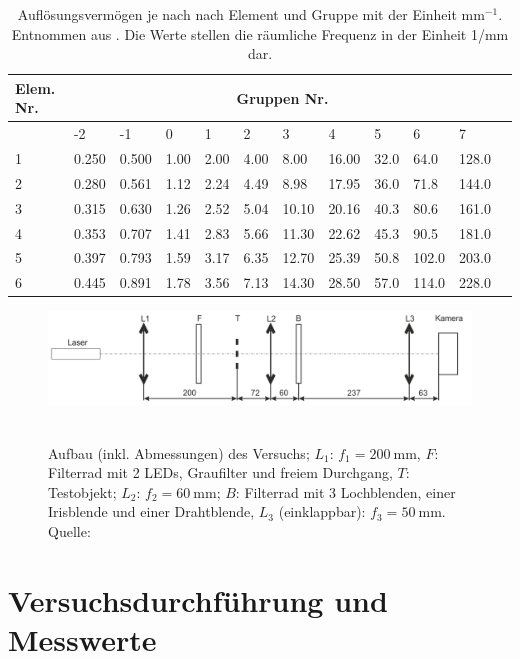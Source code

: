 \documentclass{article}
\begin{document}
\begin{table}[H]
\caption{Auflösungsvermögen je nach nach Element und Gruppe mit der Einheit mm$^{-1}$. Entnommen aus \cite{quelle6}. Die Werte stellen die räumliche Frequenz in der Einheit 1/mm dar.}
\label{tab:aufl}
\begin{tabular}{|l||l|l|l|l|l|l|l|l|l|l|l|}
\hline
\textbf{Elem. Nr.} & \multicolumn{10}{|c|}{\textbf{Gruppen Nr.}}\\
\hline
& -2 & -1 & 0 & 1 & 2 & 3 & 4 & 5 & 6 & 7 \\
\hline
1 & 0.250 & 0.500 & 1.00 & 2.00 & 4.00 & 8.00 & 16.00 & 32.0 & 64.0 & 128.0 \\
\hline
2 & 0.280 & 0.561 & 1.12 & 2.24 & 4.49 & 8.98 & 17.95 & 36.0 & 71.8 & 144.0 \\
\hline
3 & 0.315 & 0.630 & 1.26 & 2.52 & 5.04 & 10.10 & 20.16 & 40.3 & 80.6 &  161.0 \\
\hline
4 & 0.353 & 0.707 & 1.41 & 2.83 & 5.66 & 11.30 & 22.62 & 45.3 & 90.5 & 181.0 \\
\hline
5 & 0.397 & 0.793 & 1.59 & 3.17 & 6.35 & 12.70 & 25.39 & 50.8 & 102.0 & 203.0 \\
\hline
6 & 0.445 & 0.891 & 1.78 & 3.56 & 7.13 & 14.30 & 28.50 & 57.0 & 114.0 & 228.0 \\
\hline
\end{tabular}
\end{table}






\begin{figure}[H]
\caption{Aufbau (inkl. Abmessungen) des Versuchs; $L_1$: $f_1= 200~$mm, $F$: Filterrad mit 2 LEDs, Graufilter und freiem Durchgang, $T$: Testobjekt; $L_2$: $f_2= 60~$mm; $B$: Filterrad mit 3 Lochblenden, einer Irisblende und einer Drahtblende, $L_3$ (einklappbar): $f_3= 50~$mm. Quelle: \cite{quelle6}}
\label{fig:aufbau}
{\centering
\includegraphics[scale=1]{versuch.png}
~
}
\end{figure}








\section{Versuchsdurchführung und Messwerte}
\end{document}
